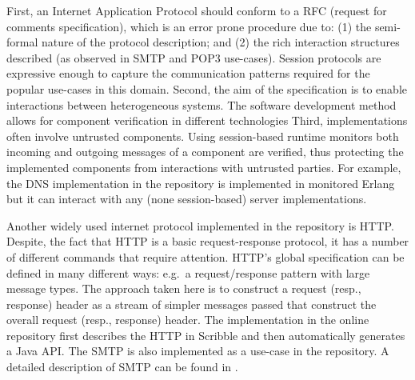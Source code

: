 First, an Internet Application Protocol should conform to
a RFC (request for comments specification), which is an error prone
procedure due to:
(1) the semi-formal nature of the protocol description; and
(2) the rich interaction structures described
(as observed in SMTP and POP3 use-cases).
Session protocols %
are expressive enough to capture the communication
patterns required for the popular use-cases in this domain.  
Second, the aim of the specification is to enable
interactions between heterogeneous systems.
The software development method allows for component
verification in different technologies
Third, implementations often involve untrusted components.
Using session-based runtime monitors both incoming and outgoing
messages of a component are verified, thus protecting the
implemented components from interactions with untrusted parties.
For example, the DNS implementation in the repository
is implemented in monitored Erlang but it can interact with any
(none session-based) server implementations.

Another widely used internet protocol implemented in the repository is HTTP.
Despite, the fact that HTTP is a basic request-response protocol,
it has a number of different commands that require attention.
HTTP's global specification can be defined in many different ways:
e.g.~a request/response pattern with large message types. The approach
taken here is to construct a request (resp., response) header as
a stream of simpler messages passed that construct the overall
request (resp., response) header. The implementation in the online
repository first describes the HTTP in Scribble and then automatically
generates a Java API.
%
The SMTP is also implemented as a use-case in the repository.
A detailed description of SMTP can be found in .





